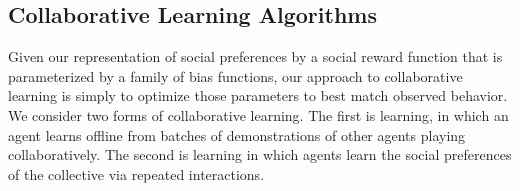 
\subsection{Collaborative Learning Algorithms}
\label{sec:learning}


Given our representation of social preferences by a social reward
function that is parameterized by a family of bias functions, our
approach to collaborative learning is simply to optimize those
parameters to best match observed behavior.  We consider two forms of
collaborative learning.  The first is  learning, in which
an agent learns offline from batches of demonstrations of other agents
playing collaboratively.  The second is  learning
in which agents learn the social preferences of the collective via
repeated interactions.




